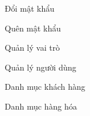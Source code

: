 Đổi mật khẩu













Quên mật khẩu


























Quản lý vai trò













Quản lý người dùng


























Danh mục khách hàng













Danh mục hàng hóa


























